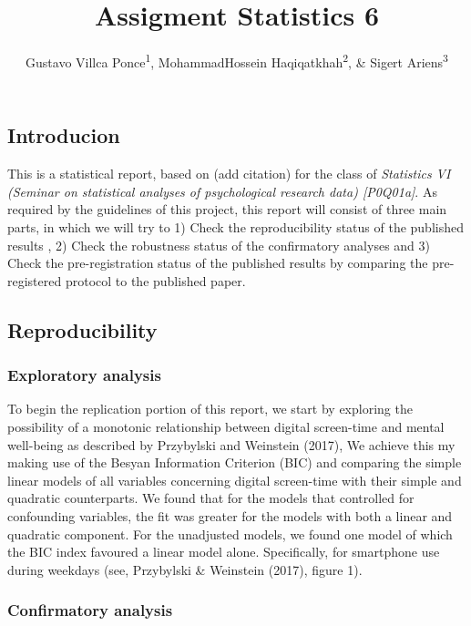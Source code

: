 \documentclass[floatsintext,man]{apa6}
\title{Assigment Statistics 6}
\author{Gustavo Villca Ponce\textsuperscript{1}, MohammadHossein Haqiqatkhah\textsuperscript{2}, \& Sigert Ariens\textsuperscript{3}}
\affiliation{
    \vspace{0.5cm}
          \textsuperscript{1} r0292033\\
          \textsuperscript{2} r0607671\\
          \textsuperscript{3} r0446864  }
\theoremstyle{definition}
\theoremstyle{definition}
\theoremstyle{definition}
\theoremstyle{remark}
\begin{document}
\maketitle

\setcounter{secnumdepth}{0}



\hypertarget{introducion}{%
\subsection{Introducion}\label{introducion}}

This is a statistical report, based on (add citation) for the class of
\emph{Statistics VI (Seminar on statistical analyses of psychological
research data) {[}P0Q01a{]}}. As required by the guidelines of this
project, this report will consist of three main parts, in which we will
try to 1) Check the reproducibility status of the published results , 2)
Check the robustness status of the confirmatory analyses and 3) Check
the pre-registration status of the published results by comparing the
pre-registered protocol to the published paper.

\hypertarget{reproducibility}{%
\subsection{Reproducibility}\label{reproducibility}}

\hypertarget{exploratory-analysis}{%
\subsubsection{Exploratory analysis}\label{exploratory-analysis}}

To begin the replication portion of this report, we start by exploring
the possibility of a monotonic relationship between digital screen-time
and mental well-being as described by Przybylski and Weinstein (2017),
We achieve this my making use of the Besyan Information Criterion (BIC)
and comparing the simple linear models of all variables concerning
digital screen-time with their simple and quadratic counterparts. We
found that for the models that controlled for confounding variables, the
fit was greater for the models with both a linear and quadratic
component. For the unadjusted models, we found one model of which the
BIC index favoured a linear model alone. Specifically, for smartphone
use during weekdays (see, Przybylski \& Weinstein (2017), figure 1).

\hypertarget{confirmatory-analysis}{%
\subsubsection{Confirmatory analysis}\label{confirmatory-analysis}}
\end{document}

